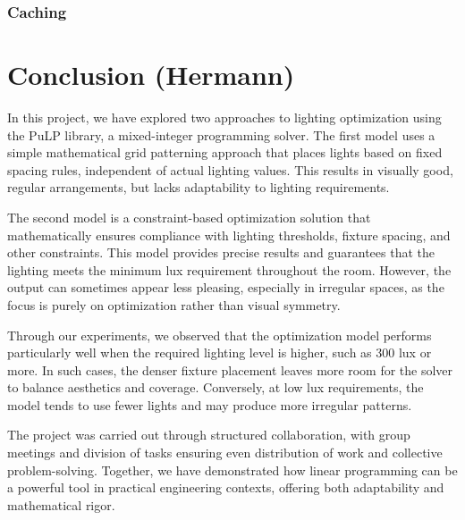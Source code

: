 \documentclass{article}
\begin{document}
\subsubsection{Caching}

\newpage

\section{Conclusion (Hermann)}

In this project, we have explored two approaches to lighting optimization using the PuLP library, a mixed-integer programming solver.
The first model uses a simple mathematical grid patterning approach that places lights based on fixed spacing rules, independent of actual lighting values.
This results in visually good, regular arrangements, but lacks adaptability to lighting requirements.

The second model is a constraint-based optimization solution that mathematically ensures compliance with lighting thresholds,
fixture spacing, and other constraints. This model provides precise results and guarantees that the lighting meets the minimum lux requirement
throughout the room. However, the output can sometimes appear less pleasing, especially in irregular spaces, as the focus is purely on optimization rather than visual symmetry.

Through our experiments, we observed that the optimization model performs particularly well when the required lighting level is higher,
such as 300 lux or more. In such cases, the denser fixture placement leaves more room for the solver to balance aesthetics and coverage.
Conversely, at low lux requirements, the model tends to use fewer lights and may produce more irregular patterns.

The project was carried out through structured collaboration, with group meetings and division of tasks ensuring even distribution of work 
and collective problem-solving. Together, we have demonstrated how linear programming can be a powerful tool
in practical engineering contexts, offering both adaptability and mathematical rigor.
\end{document}
